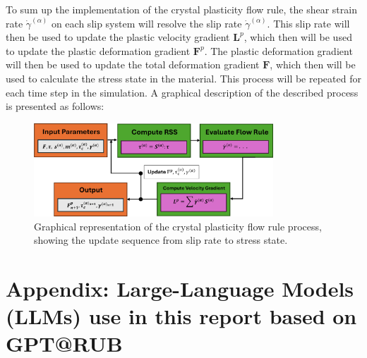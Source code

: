 \documentclass[12pt]{article}
\begin{document}
\hspace{2em}To sum up the implementation of the crystal plasticity flow rule, 
the shear strain rate $\dot{\gamma}^{(\alpha)}$ on each slip system will resolve the slip rate $\dot{\gamma}^{(\alpha)}$.
This slip rate will then be used to update the plastic velocity gradient $\boldsymbol{L}^{p}$, which then
will be used to update the plastic deformation gradient $\boldsymbol{F}^{p}$. The plastic deformation gradient
will then be used to update the total deformation gradient $\boldsymbol{F}$, which then will be used to calculate
the stress state in the material. This process will be repeated for each time step in the simulation. A graphical description
of the described process is presented as follows:
\vspace{1em}
\begin{figure}[H]
    \centering
    \includegraphics[width=0.8\textwidth]{images/graphical_FlowRule.png}
    \caption{Graphical representation of the crystal plasticity flow rule process, showing the update sequence from slip rate to stress state.}
    \label{fig:graphical_flow_rule}
\end{figure}



\newpage
\section*{Appendix: Large-Language Models (LLMs) use in this report based on GPT@RUB}


\end{document}
